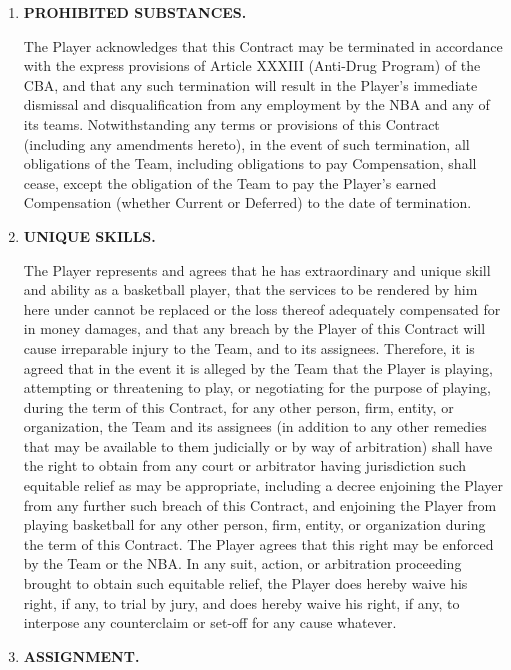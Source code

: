 \documentclass[
]{book}
\begin{document}
\begin{enumerate}
\def\labelenumi{\arabic{enumi}.}
\setcounter{enumi}{7}
\item
  \textbf{PROHIBITED SUBSTANCES.}

  The Player acknowledges that this Contract may be terminated in accordance with the express provisions of Article XXXIII (Anti-Drug Program) of the CBA, and that any such termination will result in the Player's immediate dismissal and disqualification from any employment by the NBA and any of its teams. Notwithstanding any terms or provisions of this Contract (including any amendments hereto), in the event of such termination, all obligations of the Team, including obligations to pay Compensation, shall cease, except the obligation of the Team to pay the Player's earned Compensation (whether Current or Deferred) to the date of termination.
\item
  \textbf{UNIQUE SKILLS.}

  The Player represents and agrees that he has extraordinary and unique skill and ability as a basketball player, that the services to be rendered by him here under cannot be replaced or the loss thereof adequately compensated for in money damages, and that any breach by the Player of this Contract will cause irreparable injury to the Team, and to its assignees. Therefore, it is agreed that in the event it is alleged by the Team that the Player is playing, attempting or threatening to play, or negotiating for the purpose of playing, during the term of this Contract, for any other person, firm, entity, or organization, the Team and its assignees (in addition to any other remedies that may be available to them judicially or by way of arbitration) shall have the right to obtain from any court or arbitrator having jurisdiction such equitable relief as may be appropriate, including a decree enjoining the Player from any further such breach of this Contract, and enjoining the Player from playing basketball for any other person, firm, entity, or organization during the term of this Contract. The Player agrees that this right may be enforced by the Team or the NBA. In any suit, action, or arbitration proceeding brought to obtain such equitable relief, the Player does hereby waive his right, if any, to trial by jury, and does hereby waive his right, if any, to interpose any counterclaim or set-off for any cause whatever.
\item
  \textbf{ASSIGNMENT.}
\end{enumerate}
\end{document}
